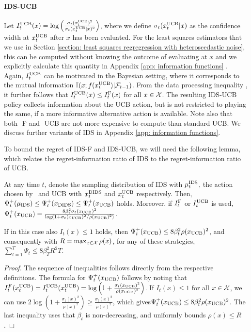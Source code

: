 \paragraph{IDS-UCB}
Let $I_t^{\text{UCB}}(x) = \log\left(\frac{\sigma_t(x_t^{\text{UCB}})^2}{\sigma_t(x_t^{\text{UCB}}|x)^2}\right)$, where we define $\sigma_t(x_t^{\text{UCB}}|x)$ as the  \vspace{-2pt} confidence width at $x_t^{\text{UCB}}$ after $x$ has been evaluated. For the least squares estimators that we use in Section \ref{section: least squares regregression with heteroscedastic noise}, this can be computed without knowing the outcome of evaluating at $x$ and we explicitly calculate this quantity in Appendix \ref{app: information functions} . Again, $I_t^{\text{UCB}}$ can be motivated in the Bayesian setting, where it corresponds to the mutual information $\mathbb{I}(x; f(x_t^{\text{UCB}})|\mathcal{F}_{t-1})$. From the data processing inequality \cite[]{CoverElementsinformationtheory2012}, it further follows that $I_t^{\text{UCB}}(x) \leq I_t^{\text{F}}(x)$ for all $x \in \mathcal{X}$. The resulting IDS-UCB policy collects information about the UCB action, but is not restricted to playing the same, if a more informative alternative action is available. Note also that both \DIDS-F and \DIDS-UCB are not more expensive to compute than standard UCB. We discuss further variants of IDS in Appendix \ref{app: information functions}.


To bound the regret of IDS-F and IDS-UCB, we will need the following lemma, which relates the regret-information ratio of IDS to the regret-information ratio of UCB.

\begin{lemma}\label{lemma: bounding the regret information surrogate}
	 At any time $t$, denote the sampling distribution of IDS with $\mu_t^{\text{IDS}}$, the action chosen by \DIDS\ and UCB with $x_t^{\text{DIDS}}$ and $x_t^{\text{UCB}}$ respectively. Then, $\Psi_t^+(\mu_{\text{IDS}}) \leq \Psi_t^+(x_{\text{DIDS}}) \leq  \Psi_t^+(x_{\text{UCB}})$ holds. Moreover, if $I_t^{\text{F}}$ or $I_t^{\text{UCB}}$ is used,  $\Psi_t^+(x_{\text{UCB}}) = \frac{8 \beta_t^2 \sigma_t(x_{\text{UCB}})^2}{ \log\left(1 + \sigma_t(x_{\text{UCB}})^2/\rho(x_{\text{UCB}})^2 \right)}$.
	 
	 If in this case also $I_t(x) \leq 1$ holds, then $\Psi_t^+(x_{\text{UCB}}) \leq 8 \beta_t^2 \rho(x_{\text{UCB}})^2$, and consequently with $R = \max_{x \in \mathcal{X}} \rho(x)$, for any of these strategies, $\sum_{t=1}^T \Psi_t  \leq  8 \beta_T^2 R^2 T$. 
\end{lemma}
\begin{proof}
	The sequence of inequalities follows directly from the respective definitions. The formula for $\Psi_t^+(x_{\text{UCB}})$ follows by noting that $I_t^F(x_t^{\text{UCB}}) = I_t^{\text{UCB}}(x_t^{\text{UCB}}) = \log\left(1 + \frac{\sigma_t(x_{\text{UCB}})^2}{\rho(x_{\text{UCB}})^2} \right)$. \vspace{-4pt} If $I_t(x) \leq 1$ for all $x \in \mathcal{X}$, we can use $2 \log\left(1 + \frac{\sigma_t(x)^2}{\rho(x)^2}\right) \geq \frac{\sigma_t(x)^2}{ \rho(x)^2}$, which gives$\Psi_t^+(x_{\text{UCB}}) \leq 8 \beta_t^2 \rho(x_{\text{UCB}})^2$. The last inequality uses that $\beta_t$ is non-decreasing, and uniformly bounds $\rho(x) \leq R$.
\end{proof}


